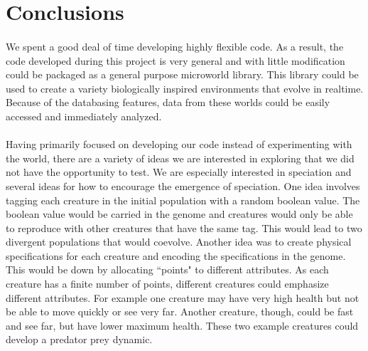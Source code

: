 \documentclass[12pt]{report}
\begin{document}
\section*{Conclusions}
\paragraph{} 
We spent a good deal of time developing highly flexible code. As a result, the code developed during this project is very general and with little modification could be packaged as a general purpose microworld  library. This library could be used to create a variety biologically inspired environments that evolve in realtime. Because of the databasing features, data from these worlds could be easily accessed and immediately analyzed.  
\paragraph{} Having primarily focused on developing our code instead of experimenting with the world, there are a variety of ideas we are interested in exploring that we did not have the opportunity to test. We are especially interested in speciation and several ideas for how to encourage the emergence of speciation. One idea involves tagging each creature in the initial population with a random boolean value. The boolean value would be carried in the genome and creatures would only be able to reproduce with other creatures that have the same tag. This would lead to two divergent populations that would coevolve. Another idea was to create physical specifications for each creature and encoding the specifications in the genome. This would be down by allocating ``points" to different attributes. As each creature has a finite number of points, different creatures could emphasize different attributes. For example one creature may have very high health but not be able to move quickly or see very far. Another creature, though, could be fast and see far, but have lower maximum health. These two example creatures could develop a predator prey dynamic.


\end{document}
